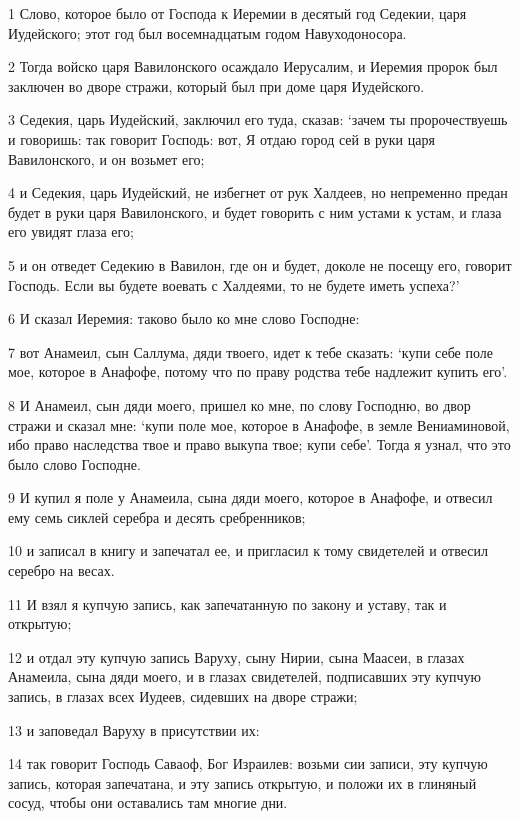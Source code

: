 \par 1 Слово, которое было от Господа к Иеремии в десятый год Седекии, царя Иудейского; этот год был восемнадцатым годом Навуходоносора.
\par 2 Тогда войско царя Вавилонского осаждало Иерусалим, и Иеремия пророк был заключен во дворе стражи, который был при доме царя Иудейского.
\par 3 Седекия, царь Иудейский, заключил его туда, сказав: `зачем ты пророчествуешь и говоришь: так говорит Господь: вот, Я отдаю город сей в руки царя Вавилонского, и он возьмет его;
\par 4 и Седекия, царь Иудейский, не избегнет от рук Халдеев, но непременно предан будет в руки царя Вавилонского, и будет говорить с ним устами к устам, и глаза его увидят глаза его;
\par 5 и он отведет Седекию в Вавилон, где он и будет, доколе не посещу его, говорит Господь. Если вы будете воевать с Халдеями, то не будете иметь успеха?'
\par 6 И сказал Иеремия: таково было ко мне слово Господне:
\par 7 вот Анамеил, сын Саллума, дяди твоего, идет к тебе сказать: `купи себе поле мое, которое в Анафофе, потому что по праву родства тебе надлежит купить его'.
\par 8 И Анамеил, сын дяди моего, пришел ко мне, по слову Господню, во двор стражи и сказал мне: `купи поле мое, которое в Анафофе, в земле Вениаминовой, ибо право наследства твое и право выкупа твое; купи себе'. Тогда я узнал, что это было слово Господне.
\par 9 И купил я поле у Анамеила, сына дяди моего, которое в Анафофе, и отвесил ему семь сиклей серебра и десять сребренников;
\par 10 и записал в книгу и запечатал ее, и пригласил к тому свидетелей и отвесил серебро на весах.
\par 11 И взял я купчую запись, как запечатанную по закону и уставу, так и открытую;
\par 12 и отдал эту купчую запись Варуху, сыну Нирии, сына Маасеи, в глазах Анамеила, сына дяди моего, и в глазах свидетелей, подписавших эту купчую запись, в глазах всех Иудеев, сидевших на дворе стражи;
\par 13 и заповедал Варуху в присутствии их:
\par 14 так говорит Господь Саваоф, Бог Израилев: возьми сии записи, эту купчую запись, которая запечатана, и эту запись открытую, и положи их в глиняный сосуд, чтобы они оставались там многие дни.
